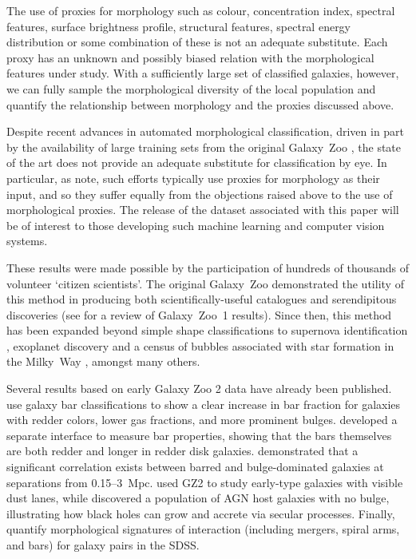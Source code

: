 \documentclass[useAMS,usenatbib]{mn2e}
\begin{document}
The use of proxies for morphology such as colour, concentration index, spectral features, surface brightness profile, structural features, spectral energy distribution or some combination of these is not an adequate substitute. Each proxy has an unknown and possibly biased relation with the morphological features under study. With a sufficiently large set of classified galaxies, however, we can fully sample the morphological diversity of the local population and quantify the relationship between morphology and the proxies discussed above. %

Despite recent advances in automated morphological classification, driven in part by the availability of large training sets from the original Galaxy~Zoo \citep{ban10,hue11,dav13}, the state of the art does not provide an adequate substitute for classification by eye. In particular, as \citet{lin11} note, such efforts typically use proxies for morphology as their input, and so they suffer equally from the objections raised above to the use of morphological proxies. The release of the dataset associated with this paper will be of interest to those developing such machine learning and computer vision systems. 

These results were made possible by the participation of hundreds of thousands of volunteer `citizen scientists'. The original Galaxy~Zoo demonstrated the utility of this method in producing both scientifically-useful catalogues and serendipitous discoveries (see \citealt{lin11} for a review of Galaxy~Zoo~1 results). Since then, this method has been expanded beyond simple shape classifications to supernova identification \citep{smi11}, exoplanet discovery \citep{fis12,sch12} and a census of bubbles associated with star formation in the Milky~Way \citep{sim12a}, amongst many others. 

Several results based on early Galaxy Zoo 2 data have already been published. \citet{mas11c,mas12a} use galaxy bar classifications to show a clear increase in bar fraction for galaxies with redder colors, lower gas fractions, and more prominent bulges. \citet{hoy11} developed a separate interface to measure bar properties, showing that the bars themselves are both redder and longer in redder disk galaxies. \citet{ski12} demonstrated that a significant correlation exists between barred and bulge-dominated galaxies at separations from 0.15--3~Mpc. \citet{kav12a} used GZ2 to study early-type galaxies with visible dust lanes, while \citet{sim13} discovered a population of AGN host galaxies with no bulge, illustrating how black holes can grow and accrete via secular processes. Finally, \citet{cas13} quantify morphological signatures of interaction (including mergers, spiral arms, and bars) for galaxy pairs in the SDSS. 
\end{document}
